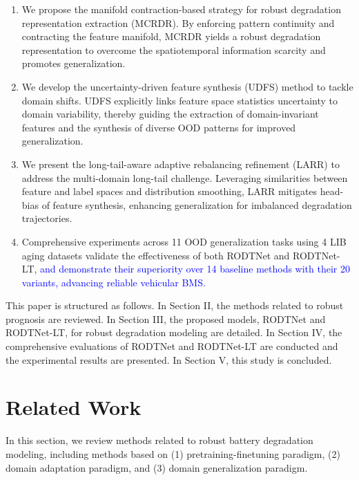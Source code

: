 \documentclass[lettersize,journal]{IEEEtran}
\newcommand{\rev}[1]{\textcolor{blue}{#1}}
\begin{document}
\begin{enumerate}
	\item We propose the manifold contraction-based strategy for robust degradation representation extraction (MCRDR). By enforcing pattern continuity and contracting the feature manifold, MCRDR yields a robust degradation representation to overcome the spatiotemporal information scarcity and promotes generalization.
	\item We develop the uncertainty-driven feature synthesis (UDFS) method to tackle domain shifts. UDFS explicitly links feature space statistics uncertainty to domain variability, thereby guiding the extraction of domain-invariant features and the synthesis of diverse OOD patterns for improved generalization.
	\item We present the long-tail-aware adaptive rebalancing refinement (LARR) to address the multi-domain long-tail challenge. Leveraging similarities between feature and label spaces and distribution smoothing, LARR mitigates head-bias of feature synthesis, enhancing generalization for imbalanced degradation trajectories.
	\item Comprehensive experiments across 11 OOD generalization tasks using 4 LIB aging datasets validate the effectiveness of both RODTNet and RODTNet-LT, \rev{and demonstrate their superiority over 14 baseline methods with their 20 variants, advancing reliable vehicular BMS.}
\end{enumerate}

This paper is structured as follows.
In Section II, the methods related to robust prognosis are reviewed.
In Section III, the proposed models, RODTNet and RODTNet-LT, for robust degradation modeling are detailed.
In Section IV, the comprehensive evaluations of RODTNet and RODTNet-LT are conducted and the experimental results are presented.
In Section V, this study is concluded.

\section{Related Work}

In this section, we review methods related to robust battery degradation modeling, including methods based on (1) pretraining-finetuning paradigm, (2) domain adaptation paradigm, and (3) domain generalization paradigm.
\end{document}
